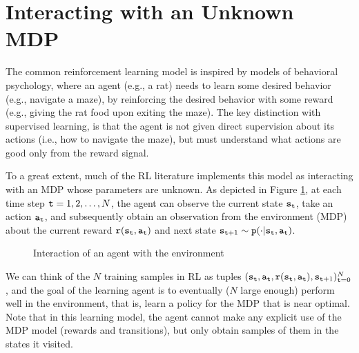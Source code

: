 \section{Interacting with an Unknown MDP}

The common reinforcement learning model is inspired by models of behavioral psychology, where an agent (e.g., a rat) needs to learn some desired behavior (e.g., navigate a maze), by reinforcing the desired behavior with some reward (e.g., giving the rat food upon exiting the maze). The key distinction with supervised learning, is that the agent is not given direct supervision about its actions (i.e., how to navigate the maze), but must understand what actions are good only from the reward signal.

To a great extent, much of the RL literature implements this model as interacting with an MDP whose parameters are unknown. As depicted in Figure \ref{fig:RL_model_fig}, at each time step ${\tt t} = 1,2,\dots, N$, the agent can observe the current state ${\tt s}_{\tt t}$, take an action ${\tt a}_{\tt t}$, and subsequently obtain an observation from the environment (MDP) about the current reward ${\tt r}({\tt s}_{\tt t},{\tt a}_{\tt t})$ and next state ${\tt s}_{{\tt t}+1}\sim {\tt p}(\cdot | {\tt s}_{\tt t}, {\tt a}_{\tt t})$.

\begin{figure}[h]
    \centering
    \caption{Interaction of an agent with the environment}
    \label{fig:RL_model_fig}
\end{figure}

We can think of the $N$ training samples in RL as tuples $({\tt s}_{\tt t},{\tt a}_{\tt t},{\tt r}({\tt s}_{\tt t},{\tt a}_{\tt t}),{\tt s}_{{\tt t}+1})_{{\tt t}=0}^{N}$, and the goal of the learning agent is to eventually ($N$ large enough) perform well in the environment, that is, learn a policy for the MDP that is near optimal. Note that in this learning model, the agent cannot make any explicit use of the MDP model (rewards and transitions), but only obtain samples of them in the states it visited.

